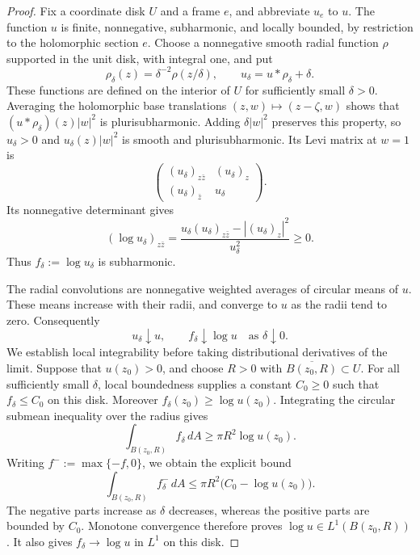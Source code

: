 \begin{proof}
Fix a coordinate disk $U$ and a frame $e$, and abbreviate $u_e$ to $u$.
The function $u$ is finite, nonnegative, subharmonic, and locally bounded,
by restriction to the holomorphic section $e$.  Choose a nonnegative
smooth radial function $\rho$ supported in the unit disk, with integral
one, and put
\[
 \rho_\delta(z)=\delta^{-2}\rho(z/\delta),
 \qquad u_\delta=u*\rho_\delta+\delta.
\]
These functions are defined on the interior of $U$ for sufficiently
small $\delta>0$.  Averaging the holomorphic base translations
$(z,w)\mapsto(z-\zeta,w)$ shows that
$(u*\rho_\delta)(z)|w|^2$ is plurisubharmonic.  Adding
$\delta|w|^2$ preserves this property, so $u_\delta>0$ and
$u_\delta(z)|w|^2$ is smooth and plurisubharmonic.  Its Levi matrix at
$w=1$ is
\[
 \begin{pmatrix}
  (u_\delta)_{z\bar z} & (u_\delta)_z\\
  (u_\delta)_{\bar z} & u_\delta
 \end{pmatrix}.
\]
Its nonnegative determinant gives
\[
 (\log u_\delta)_{z\bar z}
 =\frac{u_\delta(u_\delta)_{z\bar z}
             -|(u_\delta)_z|^2}{u_\delta^2}\geq0.
\]
Thus $f_\delta:=\log u_\delta$ is subharmonic.

The radial convolutions are nonnegative weighted averages of circular
means of $u$.  These means increase with their radii, and converge to
$u$ as the radii tend to zero.  Consequently
\[
 u_\delta\downarrow u,
 \qquad f_\delta\downarrow\log u
 \quad\text{as }\delta\downarrow0.
\]
We establish local integrability before taking distributional
derivatives of the limit.  Suppose that $u(z_0)>0$, and choose $R>0$
with $\overline{B(z_0,R)}\subset U$.  For all sufficiently small
$\delta$, local boundedness supplies a constant $C_0\geq0$ such that
$f_\delta\leq C_0$ on this disk.  Moreover
$f_\delta(z_0)\geq\log u(z_0)$.  Integrating the circular submean
inequality over the radius gives
\[
 \int_{B(z_0,R)} f_\delta\,dA
 \geq \pi R^2\log u(z_0).
\]
Writing $f^-:=\max\{-f,0\}$, we obtain the explicit bound
\begin{equation}
 \label{eq:log-negative-part}
 \int_{B(z_0,R)} f_\delta^-\,dA
 \leq \pi R^2\bigl(C_0-\log u(z_0)\bigr).
\end{equation}
The negative parts increase as $\delta$ decreases, whereas the positive
parts are bounded by $C_0$.  Monotone convergence therefore proves
$\log u\in L^1(B(z_0,R))$.  It also gives
$f_\delta\to\log u$ in $L^1$ on this disk.


\end{proof}
